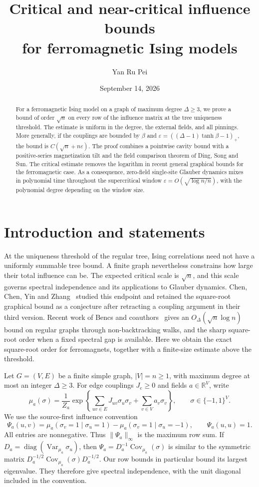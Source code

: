 \documentclass[11pt]{article}
\title{Critical and near-critical influence bounds\\for ferromagnetic Ising models}
\author{Yan Ru Pei}
\date{September 14, 2026}
\theoremstyle{remark}
\newcommand{\R}{\mathbb R}
\newcommand{\Cov}{\operatorname{Cov}}
\newcommand{\Var}{\operatorname{Var}}
\begin{document}
\maketitle
\begin{abstract}
For a ferromagnetic Ising model on a graph of maximum degree $\Delta\ge3$,
we prove a bound of order $\sqrt n$ on every row of the influence matrix
at the tree uniqueness threshold. The estimate is uniform in the degree,
the external fields, and all pinnings. More generally, if the couplings
are bounded by $\beta$ and
$\varepsilon=((\Delta-1)\tanh\beta-1)_+$, the bound is
$C(\sqrt n+n\varepsilon)$.
The proof combines a pointwise cavity bound with a positive-series
magnetization tilt and the field comparison theorem of Ding, Song and Sun.
The critical estimate removes the logarithm in recent general graphical
bounds for the ferromagnetic case.
As a consequence, zero-field single-site Glauber dynamics mixes in
polynomial time throughout the supercritical window
$\varepsilon=O(\sqrt{\log n/n})$, with the polynomial degree depending on the
window size.
\end{abstract}

\section{Introduction and statements}

At the uniqueness threshold of the regular tree, Ising correlations need
not have a uniformly summable tree bound. A finite graph nevertheless
constrains how large their total influence can be. The expected critical
scale is $\sqrt n$, and this scale governs spectral independence and
its applications to Glauber dynamics.
Chen, Chen, Yin and Zhang~\cite{CCYZ} studied this endpoint and retained
the square-root graphical bound as a conjecture after retracting a
coupling argument in their third version.
Recent work of Bencs and coauthors~\cite{NBW} gives an
$O_\Delta(\sqrt n\log n)$ bound on regular graphs through
non-backtracking walks, and the sharp square-root order when a
fixed spectral gap is available.
Here we obtain the exact square-root order for ferromagnets, together
with a finite-size estimate above the threshold.

Let $G=(V,E)$ be a finite simple graph, $|V|=n\ge1$, with maximum
degree at most an integer $\Delta\ge3$.
For edge couplings $J_e\ge0$ and fields $a\in\R^V$, write
\[
 \mu_a(\sigma)=\frac1{Z_a}
 \exp\left\{\sum_{uv\in E}J_{uv}\sigma_u\sigma_v
                     +\sum_{v\in V}a_v\sigma_v\right\},
 \qquad \sigma\in\{-1,1\}^V .
\]
We use the source-first influence convention
\begin{equation}\label{eq:influence}
 \Psi_a(u,v)=\mu_a(\sigma_v=1\mid\sigma_u=1)
                   -\mu_a(\sigma_v=1\mid\sigma_u=-1),
 \qquad \Psi_a(u,u)=1.
\end{equation}
All entries are nonnegative. Thus $\|\Psi_a\|_\infty$ is the maximum
row sum. If $D_a=\operatorname{diag}(\Var_{\mu_a}\sigma_u)$, then
$\Psi_a=D_a^{-1}\Cov_{\mu_a}(\sigma)$ is similar to the symmetric matrix
$D_a^{-1/2}\Cov_{\mu_a}(\sigma)D_a^{-1/2}$.
Our row bounds in particular bound its largest eigenvalue.
They therefore give spectral independence, with the unit diagonal
included in the convention.
\end{document}
